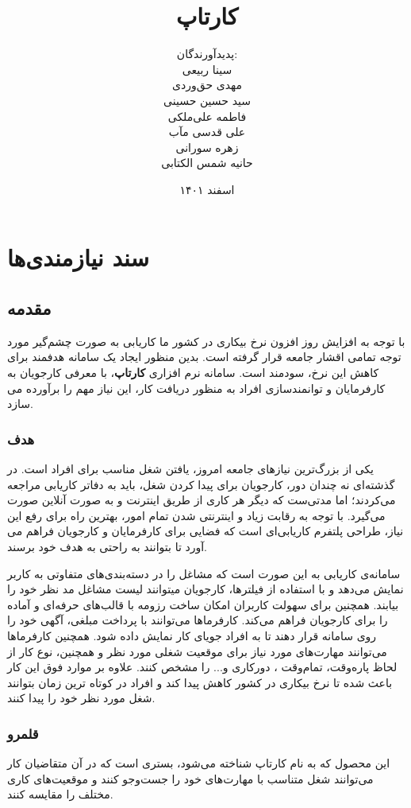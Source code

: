 \documentclass[12pt]{book}
\title{
	{\Huge کارتاپ}
}
\author{
	پدید‌آورندگان: \\
	سینا ربیعی \\
	مهدی حق‌وردی \\
	سید حسین حسینی \\
	فاطمه علی‌ملکی \\
	علی قدسی مآب \\
	زهره سورانی \\
	حانیه شمس الکتابی \\
	
}
\date{اسفند ۱۴۰۱}
\begin{document}
	\renewcommand{\bibname}{مراجع}
	\maketitle
	\tableofcontents
	
	\chapter{سند نیازمندی‌ها}
	\section{مقدمه} 
	با توجه به افزایش روز افزون نرخ بیکاری در کشور ما کاریابی به صورت چشم‌گیر مورد توجه تمامی اقشار جامعه قرار گرفته است. بدین منظور ایجاد یک سامانه هدفمند برای کاهش این نرخ، سودمند است. سامانه نرم افزاری \textbf{کارتاپ}، با معرفی کارجویان به کارفرمایان و توانمندسازی افراد به منظور دریافت کار، این نیاز مهم را برآورده می سازد.
	\subsection{هدف}
	یکی از بزرگ‌ترین نیازهای جامعه امروز، یافتن شغل مناسب برای افراد است. در گذشته‌ای نه چندان دور، کارجویان برای پیدا کردن شغل، باید به دفاتر کاریابی مراجعه می‌کردند؛ اما مدتی‌ست که دیگر هر کاری از طریق اینترنت و به صورت آنلاین صورت می‌گیرد. با توجه به رقابت زیاد و اینترنتی شدن تمام امور، بهترین راه برای رفع این نیاز، طراحی پلتفرم کاریابی‌‌ای است که فضایی برای کارفرمایان و کارجویان فراهم می آورد تا بتوانند به راحتی به هدف خود برسند.
	
	سامانه‌ی کاریابی به این صورت است که مشاغل را در دسته‌بندی‌های متفاوتی به کاربر نمایش می‌دهد و با استفاده از فیلترها، کارجویان میتوانند لیست مشاغل مد نظر خود را بیابند. همچنین برای سهولت کاربران امکان ساخت رزومه با قالب‌های حرفه‌ای و آماده را برای کارجویان فراهم می‌کند. کارفرما‌ها می‌توانند با پرداخت مبلغی، آگهی خود را روی سامانه قرار دهند تا به افراد جویای کار نمایش داده شود. همچنین کارفرماها می‌توانند مهارت‌های مورد نیاز برای موقعیت شغلی مورد نظر و همچنین، نوع کار از لحاظ پاره‌وقت، تمام‌وقت ، دورکاری و... را مشخص کنند.
	علاوه بر موارد فوق این کار باعث شده تا نرخ بیکاری در کشور کاهش پیدا کند و افراد در کوتاه ترین زمان بتوانند شغل مورد نظر خود را پیدا کنند.
	
	\subsection{قلمرو} 
	این محصول که به نام کارتاپ شناخته می‌شود، بستری است که در آن متقاضیان کار می‌توانند شغل متناسب با مهارت‌های خود را جست‌وجو کنند و موقعیت‌های کاری مختلف را مقایسه کنند.
	
\end{document}
